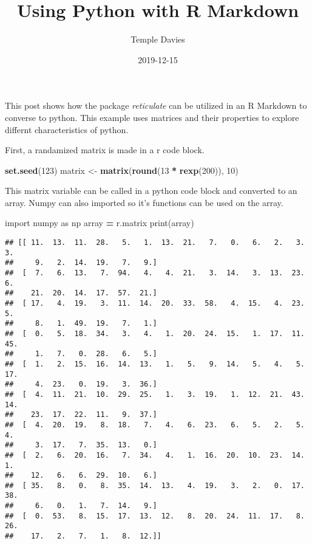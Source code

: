 \documentclass[]{article}
\title{Using Python with R Markdown}
\author{Temple Davies}
\date{2019-12-15}
\newenvironment{Shaded}{\begin{snugshade}}{\end{snugshade}}
\newcommand{\BuiltInTok}[1]{#1}
\newcommand{\DecValTok}[1]{\textcolor[rgb]{0.00,0.00,0.81}{#1}}
\newcommand{\ImportTok}[1]{#1}
\newcommand{\KeywordTok}[1]{\textcolor[rgb]{0.13,0.29,0.53}{\textbf{#1}}}
\newcommand{\NormalTok}[1]{#1}
\newcommand{\OperatorTok}[1]{\textcolor[rgb]{0.81,0.36,0.00}{\textbf{#1}}}
\newcommand{\StringTok}[1]{\textcolor[rgb]{0.31,0.60,0.02}{#1}}
\begin{document}
\maketitle

This post shows how the package \emph{reticulate} can be utilized in an
R Markdown to converse to python. This example uses matrices and their
properties to explore differnt characteristics of python.

First, a randamized matrix is made in a r code block.

\begin{Shaded}
\begin{Highlighting}[]
\KeywordTok{set.seed}\NormalTok{(}\DecValTok{123}\NormalTok{)}
\NormalTok{matrix <-}\StringTok{ }\KeywordTok{matrix}\NormalTok{(}\KeywordTok{round}\NormalTok{(}\DecValTok{13} \OperatorTok{*}\StringTok{ }\KeywordTok{rexp}\NormalTok{(}\DecValTok{200}\NormalTok{)), }\DecValTok{10}\NormalTok{)}
\end{Highlighting}
\end{Shaded}

This matrix variable can be called in a python code block and converted
to an array. Numpy can also imported so it's functions can be used on
the array.

\begin{Shaded}
\begin{Highlighting}[]
\ImportTok{import}\NormalTok{ numpy }\ImportTok{as}\NormalTok{ np}
\NormalTok{array }\OperatorTok{=}\NormalTok{ r.matrix}
\BuiltInTok{print}\NormalTok{(array)}
\end{Highlighting}
\end{Shaded}

\begin{verbatim}
## [[ 11.  13.  11.  28.   5.   1.  13.  21.   7.   0.   6.   2.   3.   3.
##     9.   2.  14.  19.   7.   9.]
##  [  7.   6.  13.   7.  94.   4.   4.  21.   3.  14.   3.  13.  23.   6.
##    21.  20.  14.  17.  57.  21.]
##  [ 17.   4.  19.   3.  11.  14.  20.  33.  58.   4.  15.   4.  23.   5.
##     8.   1.  49.  19.   7.   1.]
##  [  0.   5.  18.  34.   3.   4.   1.  20.  24.  15.   1.  17.  11.  45.
##     1.   7.   0.  28.   6.   5.]
##  [  1.   2.  15.  16.  14.  13.   1.   5.   9.  14.   5.   4.   5.  17.
##     4.  23.   0.  19.   3.  36.]
##  [  4.  11.  21.  10.  29.  25.   1.   3.  19.   1.  12.  21.  43.  14.
##    23.  17.  22.  11.   9.  37.]
##  [  4.  20.  19.   8.  18.   7.   4.   6.  23.   6.   5.   2.   5.   4.
##     3.  17.   7.  35.  13.   0.]
##  [  2.   6.  20.  16.   7.  34.   4.   1.  16.  20.  10.  23.  14.   1.
##    12.   6.   6.  29.  10.   6.]
##  [ 35.   8.   0.   8.  35.  14.  13.   4.  19.   3.   2.   0.  17.  38.
##     6.   0.   1.   7.  14.   9.]
##  [  0.  53.   8.  15.  17.  13.  12.   8.  20.  24.  11.  17.   8.  26.
##    17.   2.   7.   1.   8.  12.]]
\end{verbatim}
\end{document}
